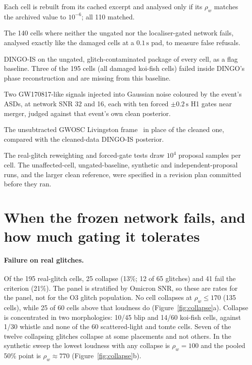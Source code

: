 \documentclass{openjournal}
\begin{document}
\begin{description}
Each cell is rebuilt from its cached excerpt and analysed only if its $\rho_w$ matches the archived value to $10^{-6}$; all 110 matched.
\item[Unaffected cells] The 140 cells where neither the ungated nor the localiser-gated network fails, analysed exactly like the damaged cells at a $0.1\,\mathrm{s}$ pad, to measure false refusals.
\item[Ungated importance sampling] DINGO-IS on the ungated, glitch-contaminated package of every cell, as a flag baseline. Three of the 195 cells (all damaged koi-fish cells) failed inside DINGO's phase reconstruction and are missing from this baseline.
\item[Synthetic events] Two GW170817-like signals injected into Gaussian noise coloured by the event's ASDs, at network SNR 32 and 16, each with ten forced $\pm0.2\,\mathrm{s}$ H1 gates near merger, judged against that event's own clean posterior.
\item[GW170817 Livingston] The unsubtracted GWOSC Livingston frame~\cite{Abbott2021opendata} in place of the cleaned one, compared with the cleaned-data DINGO-IS posterior.
\end{description}
The real-glitch reweighting and forced-gate tests draw $10^{4}$ proposal samples per cell. The unaffected-cell, ungated-baseline, synthetic and independent-proposal runs, and the larger clean reference, were specified in a revision plan committed before they ran.

\section{When the frozen network fails, and how much gating it tolerates}
\label{sec:audit}

\paragraph{Failure on real glitches.}
Of the 195 real-glitch cells, 25 collapse (13\%; 12 of 65 glitches) and 41 fail the criterion (21\%). The panel is stratified by Omicron SNR, so these are rates for the panel, not for the O3 glitch population.
No cell collapses at $\rho_w\le170$ (135 cells), while 25 of 60 cells above that loudness do (Figure~\ref{fig:collapse}a).
Collapse is concentrated in two morphologies: 10/45 blip and 14/60 koi-fish cells, against 1/30 whistle and none of the 60 scattered-light and tomte cells.
Seven of the twelve collapsing glitches collapse at some placements and not others.
In the synthetic sweep the lowest loudness with any collapse is $\rho_w=100$ and the pooled 50\% point is $\rho_w\approx770$ (Figure~\ref{fig:collapse}b).
\end{document}
